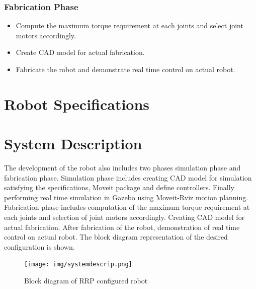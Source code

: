 \documentclass[a4paper,12pt,one side]{report}%
\begin{document}
\subsubsection{Fabrication Phase}
\begin{itemize}
    \item  Compute the maximum torque requirement at each joints and select joint motors accordingly.
    \item Create CAD model for actual fabrication.
    \item Fabricate the robot and demonstrate real time control on actual robot.
\end{itemize}

\section{Robot Specifications}




\section{System Description}

 The development of the robot also includes two phases simulation phase and fabrication phase. Simulation phase includes creating CAD model for simulation satisfying the speciﬁcations, Moveit package and deﬁne controllers. Finally performing real time simulation in Gazebo using Moveit-Rviz motion planning. Fabrication phase includes computation of the maximum torque requirement at each joints and selection of joint motors accordingly. Creating CAD model for actual fabrication. After fabrication of the robot, demonstration of real time control on actual robot. The block diagram representation of the desired configuration is shown.
 
 \begin{figure}[h]
    \centering
     \texttt{[image: img/systemdescrip.png]}
    \caption{Block diagram of RRP configured robot}
    \label{fig:systemdescrip}
\end{figure}
 



    
\end{document}
